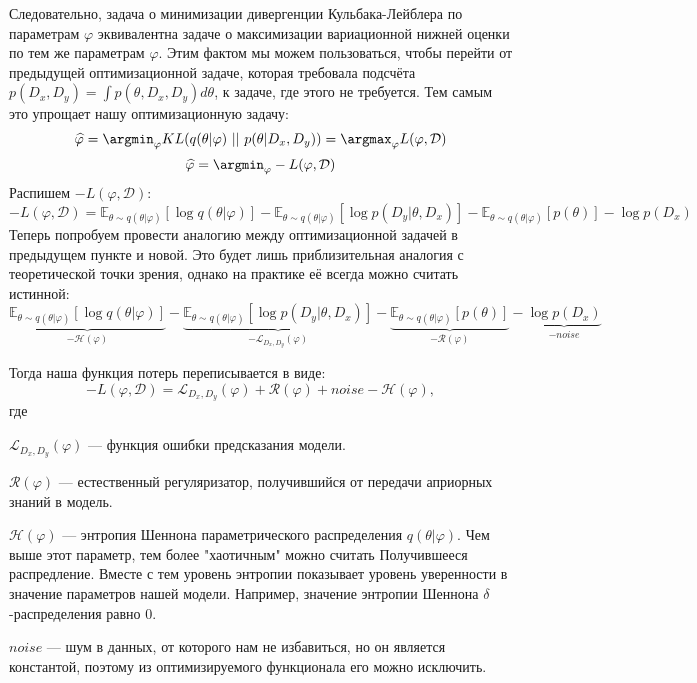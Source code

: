 Следовательно, задача о минимизации дивергенции Кульбака-Лейблера по параметрам $\varphi$ эквивалентна задаче о максимизации вариационной нижней оценки по тем же параметрам $\varphi$. Этим
 фактом мы можем пользоваться, чтобы перейти от предыдущей оптимизационной задаче, которая требовала подсчёта $p(D_x, D_y) = \int p(\theta, D_x, D_y) d\theta$, к
 задаче, где этого не требуется. Тем самым это упрощает нашу оптимизационную задачу:
$$\widehat{\varphi} = \argmin_{\varphi} KL(q(\theta | \varphi)\ ||\ p(\theta | D_x, D_y)) = \argmax_{\varphi} L(\varphi, \mathcal{D})$$
$$\widehat{\varphi} = \argmin_{\varphi} -L(\varphi, \mathcal{D})$$
Распишем $-L(\varphi, \mathcal{D})$:
$$-L(\varphi, \mathcal{D}) =  \mathbb{E}_{\theta \sim q(\theta | \varphi)} [\log q(\theta | \varphi)] -
\mathbb{E}_{\theta \sim q(\theta | \varphi)} [\log p(D_y | \theta, D_x)] - \mathbb{E}_{\theta \sim q(\theta | \varphi)} [p(\theta)] - \log p(D_x)$$
Теперь попробуем провести аналогию между оптимизационной задачей в предыдущем пункте и новой. Это будет лишь приблизительная аналогия с теоретической точки зрения,
 однако на практике её всегда можно считать истинной:
$$\underbrace{\mathbb{E}_{\theta \sim q(\theta | \varphi)} [\log q(\theta | \varphi)]}_{-\mathcal{H}(\varphi)} -
\underbrace{\mathbb{E}_{\theta \sim q(\theta | \varphi)} [\log p(D_y | \theta, D_x)]}_{-\mathcal{L}_{D_x,D_y}(\varphi)} -
\underbrace{\mathbb{E}_{\theta \sim q(\theta | \varphi)} [p(\theta)]}_{-\mathcal{R}(\varphi)} - \underbrace{\log p(D_x)}_{-noise}$$

Тогда наша функция потерь переписывается в виде:
$$-L(\varphi, \mathcal{D}) = \mathcal{L}_{D_x,D_y}(\varphi) + \mathcal{R}(\varphi) + noise - \mathcal{H}(\varphi),$$
где

$\mathcal{L}_{D_x,D_y}(\varphi)$ --- функция ошибки предсказания модели.

$\mathcal{R}(\varphi)$ --- естественный регуляризатор, получившийся от передачи априорных знаний в модель.

$\mathcal{H}(\varphi)$ --- энтропия Шеннона параметрического распределения $q(\theta | \varphi)$. Чем выше этот параметр, тем более "хаотичным" можно считать
 Получившееся распредление. Вместе с тем уровень энтропии показывает уровень уверенности в значение параметров нашей модели. Например, значение энтропии Шеннона
 $\delta$-распределения равно 0.

$noise$ --- шум в данных, от которого нам не избавиться, но он является константой, поэтому из оптимизируемого функционала его можно исключить.

